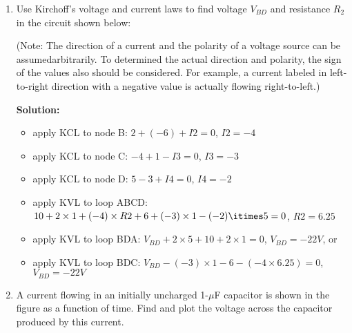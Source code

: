 \begin{enumerate}
\begin{enumerate}
\item What are required of the ammeter and the voltmeter to minimize their
	influences on the measurements? 

{\bf Solution:}
The ammeter should have minimum (ideally 0) impedance while the voltmeter
should have maximum (ideally infinity) impedance. 

\item How would the ammeter and the voltmeter affect the measurement of the
	current and the voltage in either of the configurations (a and b)?
\end{enumerate}

{\bf Solution:}
In (a) the voltmeter will by-pass some current so that the actual current
through the load is smaller than the reading of the ammeter; 

in (b) the ammeter will cause some voltage drop and the actual voltage 
across the load is lower than the reading of the voltmeter. 

\item Use Kirchoff's voltage and current laws to find voltage $V_{BD}$ and resistance 
$R_2$ in the circuit shown below:


(Note: The direction of a current and the polarity of a voltage source can
be assumedarbitrarily. To determined the actual direction and polarity, the
sign of the values also should be considered. For example, a current labeled 
in left-to-right direction with a negative value is actually flowing 
right-to-left.)

{\bf Solution:}
\begin{itemize}
\item apply KCL to node B: $2+(-6)+I2=0$, $I2=-4$ 
\item apply KCL to node C: $-4+1-I3=0$, $I3=-3$
\item apply KCL to node D: $5-3+I4=0$, $I4=-2$
\item apply KVL to loop ABCD: 
	$10+2\times 1+(-4)\times R2+6+(-3)\times 1-(-2)\itimes 5=0$, 
	$R2=6.25$
\item apply KVL to loop BDA: $V_{BD}+2\times 5+10+2\times 1=0$, 
	$V_{BD}=-22V$, or
\item apply KVL to loop BDC: $V_{BD}-(-3)\times 1-6-(-4\times 6.25)=0$, 
	$V_{BD}=-22V$
\end{itemize}

\item A current flowing in an initially uncharged 1-$\mu$F capacitor is shown
  in the figure as a function of time. Find and plot the voltage across the 
  capacitor produced by this current.


\end{enumerate}
